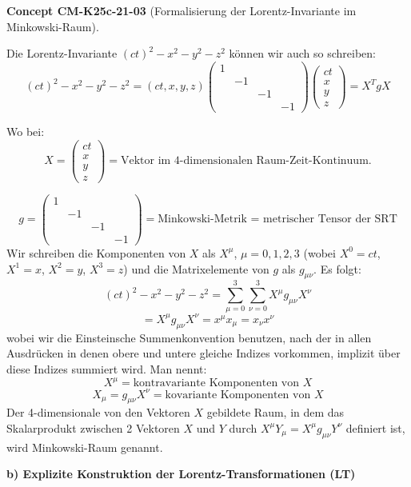 \documentclass[10pt, letterpaper]{article}
\newcommand{\CustomHeading}[3]{%
  \par\medskip\noindent%
  \textbf{#1 #2} \textnormal{(#3)}.\enskip%
}
\newenvironment{CONC}[2]{\begin{unitbox}\CustomHeading{Concept}{#1}{#2}}{\end{unitbox}}
\begin{document}
\begin{CONC}{CM-K25c-21-03}{Formalisierung der Lorentz-Invariante im Minkowski-Raum}
Die Lorentz-Invariante $(ct)^2-x^2-y^2-z^2$ können wir auch so schreiben:
\[(ct)^2-x^2-y^2-z^2 = (ct,x,y,z)\begin{pmatrix} 1 & & & \\ & -1 & & \\  & & -1 & \\ & & & -1 \end{pmatrix}\begin{pmatrix} ct \\ x \\ y \\ z\end{pmatrix} = X^T g X\]

Wo bei:
\[X = \begin{pmatrix} ct \\ x \\ y \\ z\end{pmatrix} = \text{Vektor im 4-dimensionalen Raum-Zeit-Kontinuum.}\]

\[g = \begin{pmatrix} 1 & & & \\ & -1 & & \\  & & -1 & \\ & & & -1 \end{pmatrix} = \text{Minkowski-Metrik = metrischer Tensor der SRT}\]
Wir schreiben die Komponenten von $X$ als $X^\mu$, $\mu=0,1,2,3$ (wobei $X^0=ct$, $X^1=x$, $X^2=y$, $X^3=z$) und die Matrixelemente von $g$ als $g_{\mu\nu}$. Es folgt:
\[(ct)^2-x^2-y^2-z^2 = \sum_{\mu=0}^3 \sum_{\nu=0}^3 X^\mu g_{\mu\nu} X^\nu\]
\[= X^\mu g_{\mu\nu} X^\nu = x^\mu x_\mu=x_\nu x^\nu\]
wobei wir die Einsteinsche Summenkonvention benutzen, nach der in allen Ausdrücken in denen obere und untere gleiche Indizes vorkommen, implizit über diese Indizes summiert wird.
Man nennt:
\[ X^\mu = \text{kontravariante Komponenten von } X \]
\[ X_\mu = g_{\mu\nu}X^\nu = \text{kovariante Komponenten von } X \]
Der 4-dimensionale von den Vektoren $X$ gebildete Raum, in dem das Skalarprodukt zwischen 2 Vektoren $X$ und $Y$ durch $X^\mu Y_\mu = X^\mu g_{\mu\nu}Y^\nu$ definiert ist, wird Minkowski-Raum genannt.
\end{CONC}



\textbf{b) Explizite Konstruktion der Lorentz-Transformationen (LT)}
\end{document}
